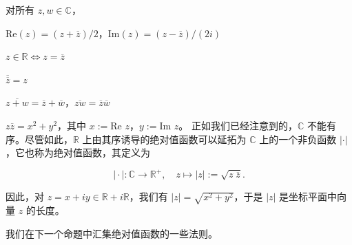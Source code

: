 \begin{proposition}

对所有 $ z, w \in \mathbb{C} $，

\begin{subitems}
\item

$ \mathrm{Re}(z) = (z + \overline{z})/2 $，$ \mathrm{Im}(z) = (z - \overline{z})/(2i) $

\item

$ z \in \mathbb{R} \Leftrightarrow z = \overline{z} $

\item

$ \overline{\overline{z}}=z $

\item

$ \overline{z + w} = \overline{z} + \overline{w} $，$ \overline{z w} = \overline{z} \overline{w} $

\item

$ z\overline{z} = x^2 + y^2 $，其中 $ x := \text{Re } z $，$ y := \text{Im } z $。
正如我们已经注意到的，$ \mathbb{C} $ 不能有序。尽管如此，$\mathbb{R}$ 上由其序诱导的绝对值函数可以延拓为 $ \mathbb{C} $ 上的一个非负函数 $ |\cdot| $，它也称为绝对值函数，其定义为

\[
\mid\cdot\mid:\mathbb{C}\to\mathbb{R}^{+},\quad z\mapsto|z|:=\sqrt{z\;\overline{{z}}}.
\]

因此，对 $ z = x + iy \in \mathbb{R} + i\mathbb{R} $，我们有 $ |z| = \sqrt{x^2 + y^2} $，于是 $ |z| $ 是坐标平面中向量 $ z $ 的长度。

\end{subitems}


我们在下一个命题中汇集绝对值函数的一些法则。

\end{proposition}

